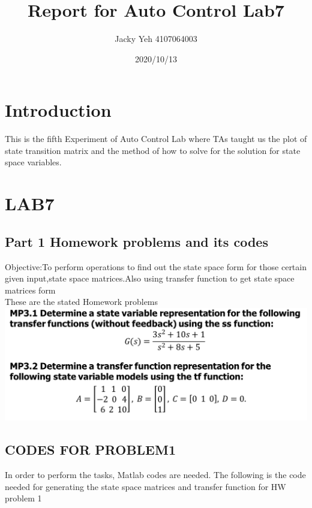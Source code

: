 \documentclass[12pt]{article}
\title{Report for Auto Control Lab7}
\date{2020/10/13}
\author{Jacky Yeh 4107064003}
\begin{document}
\begin{titlepage}

\maketitle
\end{titlepage}

\section{Introduction}
This is the fifth Experiment of Auto Control Lab where TAs taught us the plot of state transition matrix and the method of how to solve for the solution for state space variables.


\section{LAB7}
\subsection{Part 1 Homework problems and its codes}
Objective:To perform operations to find out the state space form for those certain given input,state space matrices.Also using transfer function to get state space matrices form\\

These are the stated Homework problems\\

\includegraphics[scale=0.5]{HW1_problem.png} \\


\subsection{CODES FOR PROBLEM1}
In order to perform the tasks, Matlab codes are needed. The following is the code needed for generating the state space matrices and transfer function for HW problem 1 \\
\end{document}
